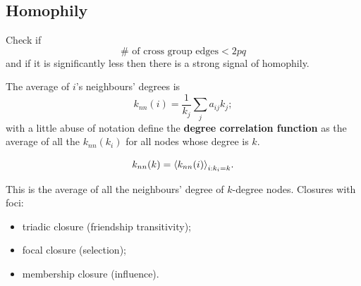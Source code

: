 \documentclass[a4paper,9pt]{extarticle}
\begin{document}
\begin{multicols*}{2}
	\section{Homophily}
	\begin{riquadro}
		Check if 
		\begin{equation*}
			\#\text{ of cross group edges}<2pq
		\end{equation*}
		and if it is significantly less then there is a strong signal of homophily.
	\end{riquadro}
	The average of $i$'s neighbours' degrees is
	\begin{equation*}
		k_{nn}(i)=\frac{1}{k_{j}}\sum_{j}a_{ij}k_{j};
	\end{equation*}
	with a little abuse of notation define the \textbf{degree correlation function} as the average of all the $k_{nn}\left(k_{i}\right)$ for all nodes whose degree is $k$.
	\begin{riquadro}
		\begin{equation*}
			k_{nn}(k)={\langle k_{nn}(i) \rangle}_{i:k_{i}=k}.
		\end{equation*}
	\end{riquadro}
	This is the average of all the neighbours' degree of $k$-degree nodes.
	Closures with foci:
	\begin{itemize}
		\item triadic closure (friendship transitivity);
		\item focal closure (selection);
		\item membership closure (influence).
	\end{itemize}

\end{multicols*}
\end{document}
